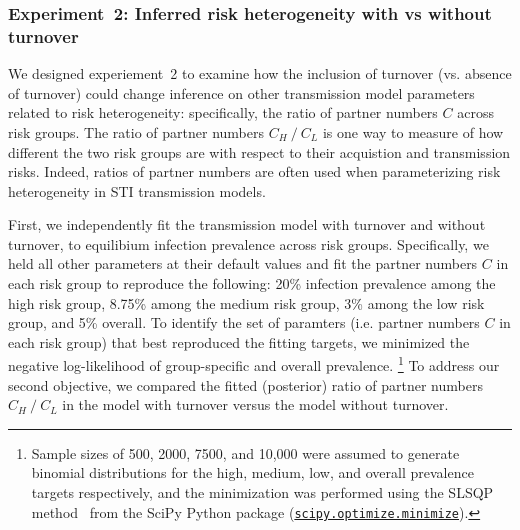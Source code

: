 \subsubsection{Experiment~2: Inferred risk heterogeneity with vs without turnover}
\label{sss:exp-infer}
We designed experiement~2 to examine how the inclusion of turnover
(vs. absence of turnover) could change inference on other transmission model parameters 
related to risk heterogeneity: specifically,
the ratio of partner numbers  $C$ across risk groups.							%
The ratio of partner numbers $C_H~/~C_L$
is one way to measure of how different the two 
risk groups are with respect to their 
acquistion and transmission risks.	 
Indeed, ratios of partner numbers are often used when parameterizing 
risk heterogeneity in STI transmission models.						%
				
First, we independently fit the transmission model with turnover 
and without turnover, to
equilibium infection prevalence across risk groups. Specifically, we 
held all other parameters at their default values and
fit the partner numbers $C$ in each risk group	to reproduce the following:
20\% infection prevalence among the high risk group,
8.75\% among the medium risk group,
3\% among the low risk group,
and 5\% overall.
To identify the set of paramters (i.e.  partner numbers $C$ in each risk group)
that best reproduced the fitting targets, we minimized
the negative log-likelihood of group-specific and overall prevalence.%
\footnote{Sample sizes of 500, 2000, 7500, and 10,000 were assumed to generate binomial distributions
  for the high, medium, low, and overall prevalence targets respectively,				%
  and the minimization was performed using
  the SLSQP method~\citep{Kraft1988} from the SciPy Python package
  (\href{https://docs.scipy.org/doc/scipy/reference/generated/scipy.optimize.minimize.html}
  {\texttt{scipy.optimize.minimize}}).}
To address our second objective, we compared the fitted (posterior) ratio of partner numbers $C_H~/~C_L$		%
in the model with turnover versus the model without turnover.
